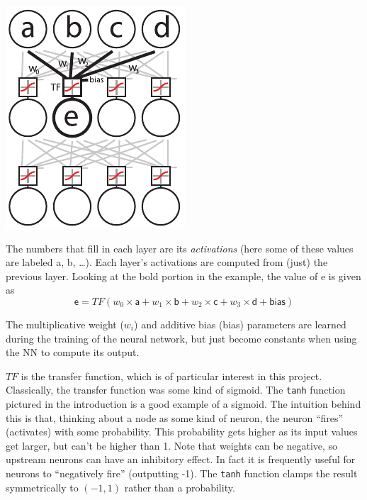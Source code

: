 \documentclass[twocolumn]{article}
\begin{document}
\begin{center}
\includegraphics[width=0.65 \linewidth]{neural-network}
\end{center}

The numbers that fill in each layer are its {\it activations} (here some
of these values are labeled {\sf a}, {\sf b}, \ldots). Each
layer's activations are computed from (just) the previous layer. Looking
at the bold portion in the example, the value of {\sf e} is given as
%
$$\textsf{e} = TF(w_{0} \times \textsf{a} + w_{1} \times \textsf{b} + w_{2} \times \textsf{c} + w_{3} \times \textsf{d} + \textsf{bias})$$

The multiplicative weight ($w_i$) and additive bias (\textsf{bias}) parameters are
learned during the training of the neural network, but just become
constants when using the NN to compute its output.

$TF$ is the transfer function, which is of particular interest in this
project. Classically, the transfer function was some kind of sigmoid.
The {\tt tanh} function pictured in the introduction is a good example
of a sigmoid. The intuition behind this is that, thinking about a node
as some kind of neuron, the neuron ``fires'' (activates) with some
probability. This probability gets higher as its input values get
larger, but can't be higher than 1. Note that weights can be negative,
so upstream neurons can have an inhibitory effect. In fact it is
frequently useful for neurons to ``negatively fire'' (outputting -1).
The {\tt tanh} function clamps the result symmetrically to $(-1, 1)$
rather than a probability.
\end{document}
